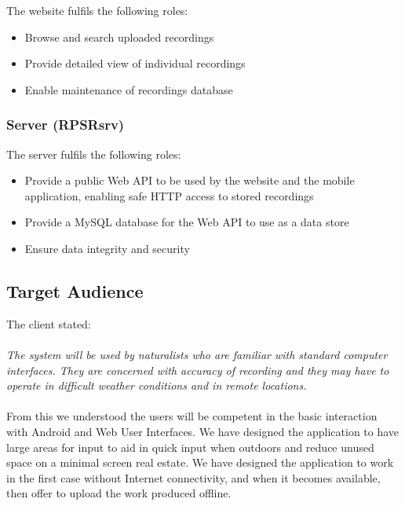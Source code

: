 \documentclass[11pt, titlepage]{article}
\begin{document}
            The website fulfils the following roles:
            
            	\begin{itemize} \itemsep0pt
            		\item Browse and search uploaded recordings
                	\item Provide detailed view of individual recordings
                	\item Enable maintenance of recordings database
                \end{itemize}
                
        \subsubsection{Server (RPSRsrv)}
        
            The server fulfils the following roles:
            \begin{itemize} \itemsep0pt
                \item Provide a public Web API to be used by the website and the mobile application,
                      enabling safe HTTP access to stored recordings
                \item Provide a MySQL database for the Web API to use as a data store
                \item Ensure data integrity and security
			\end{itemize}
		\subsection{Target Audience}
			The client stated:\\ \\ \indent \textit{The system will be used by naturalists who are familiar with standard computer interfaces. They are concerned 
with accuracy of recording and they may have to operate in difficult weather conditions and in remote locations.}\\ \\
From this we understood the users will be competent in the basic interaction with Android and Web User Interfaces. We have designed the application to have large areas for input to aid in quick input when outdoors and reduce unused space on a minimal screen real estate. We have designed the application to work in the first case without Internet connectivity, and when it becomes available, then offer to upload the work produced offline.
\end{document}
